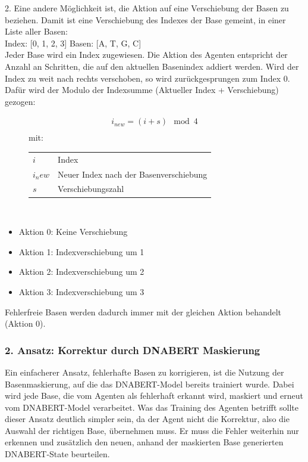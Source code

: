 \documentclass[oneside,bibliography=totocnumbered,BCOR=5mm]{scrbook}%
\makeatletter
\theoremstyle{definition}
\theoremstyle{definition}
\theoremstyle{definition}
\theoremstyle{definition}
\theoremstyle{definition}
\theoremstyle{definition}
\newenvironment{conditions}[1][mit:]
  {#1 \begin{tabular}[t]{>{$}l<{$} @{${}={}$} l}}
  {\end{tabular}\\[\belowdisplayskip]}
\makeatother
\begin{document}
2. Eine andere Möglichkeit ist, die Aktion auf eine Verschiebung der Basen zu beziehen. 
Damit ist eine Verschiebung des Indexes der Base gemeint, in einer Liste aller Basen:\\

Index: [0, 1, 2, 3]
Basen: [A, T, G, C]\\

Jeder Base wird ein Index zugewiesen. Die Aktion des Agenten entspricht der Anzahl an Schritten, die auf den aktuellen Basenindex
addiert werden. Wird der Index zu weit nach rechts verschoben, so wird zurückgesprungen zum Index 0. 
Dafür wird der Modulo der Indexsumme (Aktueller Index + Verschiebung) gezogen:\\

\begin{figure}
\begin{align*}
i_{new} = (i + s)\mod 4\\
\end{align*}
\begin{conditions}
  i      & Index \\
  i_new  & Neuer Index nach der Basenverschiebung \\
  s      & Verschiebungszahl \\
\end{conditions}
\end{figure}

\begin{itemize}
  \item Aktion 0: Keine Verschiebung
  \item Aktion 1: Indexverschiebung um 1
  \item Aktion 2: Indexverschiebung um 2
  \item Aktion 3: Indexverschiebung um 3
\end{itemize}

Fehlerfreie Basen werden dadurch immer mit der gleichen Aktion behandelt (Aktion 0). 


\subsubsection{2. Ansatz: Korrektur durch DNABERT Maskierung}
Ein einfacherer Ansatz, fehlerhafte Basen zu korrigieren, ist die Nutzung der
Basenmaskierung, auf die das DNABERT-Model bereits trainiert wurde. 
Dabei wird jede Base, die vom Agenten als fehlerhaft erkannt wird, 
maskiert und erneut vom DNABERT-Model verarbeitet.
Was das Training des Agenten betrifft sollte dieser Ansatz deutlich simpler sein,
da der Agent nicht die Korrektur, also die Auswahl der richtigen Base, übernehmen muss.
Er muss die Fehler weiterhin nur erkennen und zusätzlich den neuen, 
anhand der maskierten Base generierten DNABERT-State beurteilen.\\
\end{document}
